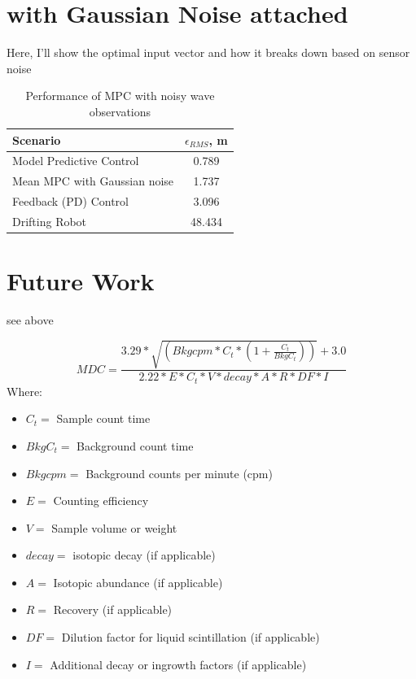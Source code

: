 \documentclass[double,12pt]{beavtex}
\begin{document}
\section{with Gaussian Noise attached}
Here, I'll show the optimal input vector and how it breaks down based on sensor noise

\begin{table}[h]
\caption{Performance of MPC with noisy wave observations}
\begin{center}
\def\arraystretch{1.5}%
\begin{tabular}{ |l|c| } 
 \hline 
  Scenario & $\epsilon_{RMS}$, m \\ 
 \hline
 Model Predictive Control & 0.789 \\ 
 Mean MPC with Gaussian noise & 1.737 \\
 Feedback (PD) Control & 3.096 \\ 
 Drifting Robot & 48.434 \\
 \hline
\end{tabular}
\end{center}
\label{table:noiseData}
\end{table}

\section{Future Work}
see above


\begin{equation}
MDC=\frac{3.29*\sqrt{(Bkgcpm*C_{t}*(1+\frac{C_{t}}{BkgC_{t}}))}+3.0}{2.22*E*C_{t}*V*decay*A*R*DF*I}
\label{eq:mdc}
\end{equation}
Where:

\begin{itemize}
\item $C_{t} =$ Sample count time
\item $BkgC_{t} =$ Background count time
\item $Bkgcpm =$ Background counts per minute (cpm)
\item $E =$ Counting efficiency
\item $V =$ Sample volume or weight
\item $decay =$ isotopic decay (if applicable)
\item $A =$ Isotopic abundance (if applicable)
\item $R =$ Recovery (if applicable)
\item $DF =$ Dilution factor for liquid scintillation (if applicable)
\item $I =$ Additional decay or ingrowth factors (if applicable)
\end{itemize}
\end{document}
